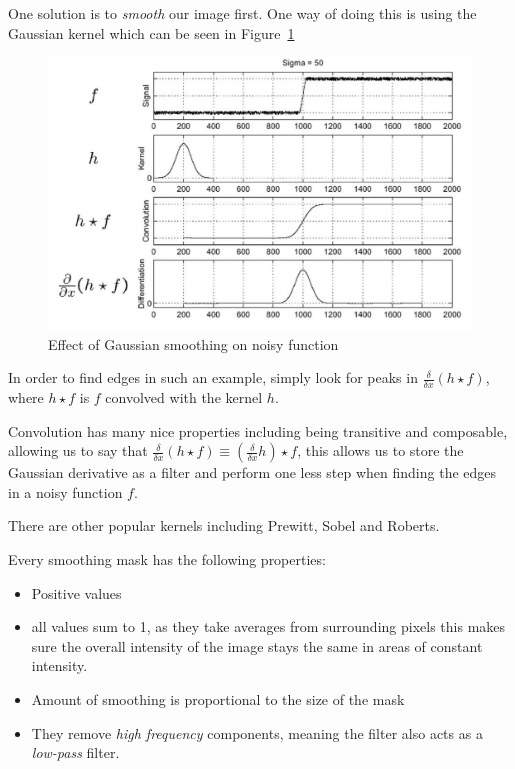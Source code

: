 \documentclass{article}
\begin{document}
One solution is to \textit{smooth} our image first. One way of doing this is using the Gaussian kernel which can be seen in Figure~\ref{fig:Gaussian smoothing}

\begin{figure}[ht]
  \centering
  \includegraphics[scale=0.3]{figures/l3-1.png}
  \caption{\label{fig:Gaussian smoothing} Effect of Gaussian smoothing on noisy function}
\end{figure}

In order to find edges in such an example, simply look for peaks in $\frac{\delta}{\delta x}(h \star f)$, where $h\star f$ is $f$ convolved with the kernel $h$.

Convolution has many nice properties including being transitive and composable, allowing us to say that $\frac{\delta}{\delta x}(h \star f) \equiv (\frac{\delta}{\delta x}h) \star f$, this allows us to store the Gaussian derivative as a filter and perform one less step when finding the edges in a noisy function $f$.

There are other popular kernels including Prewitt, Sobel and Roberts.

Every smoothing mask has the following properties:

\begin{itemize}
  \item Positive values
  \item all values sum to 1, as they take averages from surrounding pixels this makes sure the overall intensity of the image stays the same in areas of constant intensity.
  \item Amount of smoothing is proportional to the size of the mask
        \item They remove \textit{high frequency} components, meaning the filter also acts as a \textit{low-pass} filter.
\end{itemize}
\end{document}
